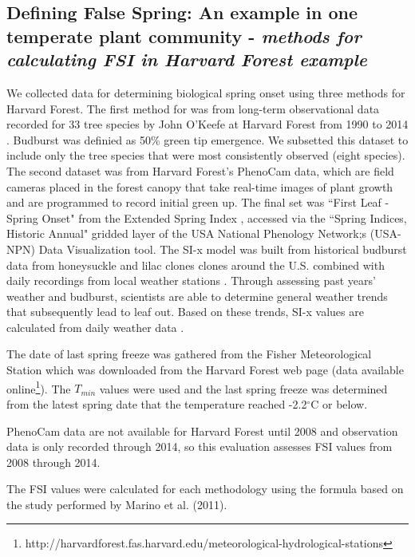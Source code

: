 \documentclass{article}\usepackage[]{graphicx}\usepackage[]{color}
\begin{document}
\subsection*{Defining False Spring: An example in one temperate plant community - \textit{methods for calculating FSI in Harvard Forest example}}
We collected data for determining biological spring onset using three methods for Harvard Forest. The first method for was from long-term observational data recorded for 33 tree species by John O'Keefe at Harvard Forest from 1990 to 2014 \citep{OKeefe2014}. Budburst was definied as 50\% green tip emergence. We subsetted this dataset to include only the tree species that were most consistently observed (eight species). The second dataset was from Harvard Forest's PhenoCam data, which are field cameras placed in the forest canopy that take real-time images of plant growth and are programmed to record initial green up. The final set was ``First Leaf - Spring Onset"  from the Extended Spring Index \citep[SI-X,][]{SI-x2016}, accessed via the ``Spring Indices, Historic Annual" gridded layer of the USA National Phenology Network;s (USA-NPN) Data Visualization tool. The SI-x model was built from historical budburst data from honeysuckle and lilac clones clones around the U.S. combined with daily recordings from local weather stations \citep{USA-NPN2016, Ault2015, Ault2015a, Schwartz2013, Schwartz1997}. Through assessing past years' weather and budburst, scientists are able to determine general weather trends that subsequently lead to leaf out. Based on these trends, SI-x values are calculated from daily weather data \citep{USA-NPN2016}.
\par
The date of last spring freeze was gathered from the Fisher Meteorological Station which was downloaded from the Harvard Forest web page (data available online\footnote{http://harvardforest.fas.harvard.edu/meteorological-hydrological-stations}). The $T_{min}$ values were used and the last spring freeze was determined from the latest spring date that the temperature reached -2.2$^{\circ}$C or below. 
\par
PhenoCam data are not available for Harvard Forest until 2008 and observation data is only recorded through 2014, so this evaluation assesses FSI values from 2008 through 2014.
\par The FSI values were calculated for each methodology using the formula based on the study performed by Marino et al. (2011).  
\end{document}
